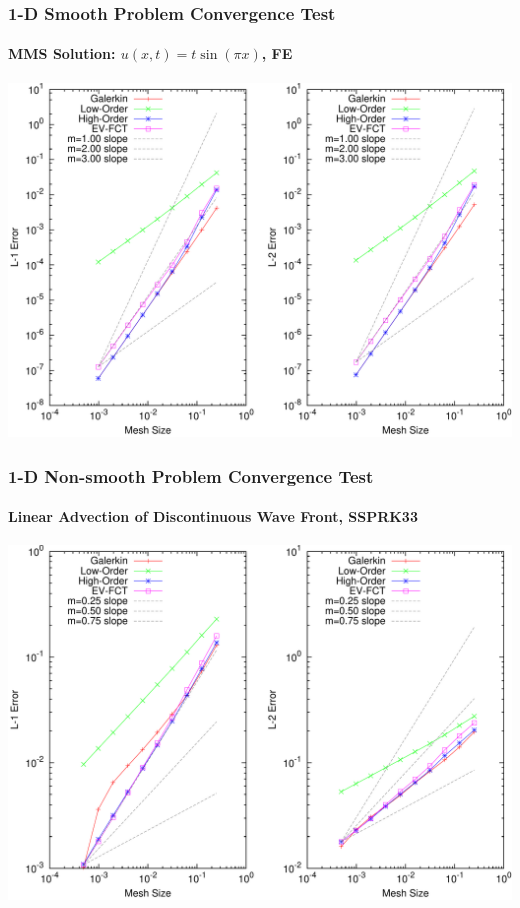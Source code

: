 \begin{frame}
\frametitle{1-D Smooth Problem Convergence Test}
\framesubtitle{MMS Solution: $u(x,t)=t\sin(\pi x)$, FE}

\begin{center}
\includegraphics[height=0.8\textheight]{./figures/convergence_smooth_FE.pdf}
\end{center}

\end{frame}
\begin{frame}
\frametitle{1-D Non-smooth Problem Convergence Test}
\framesubtitle{Linear Advection of Discontinuous Wave Front, SSPRK33}

\begin{center}
\includegraphics[height=0.8\textheight]{./figures/convergence_absorber_SSPRK33.pdf}
\end{center}

\end{frame}
